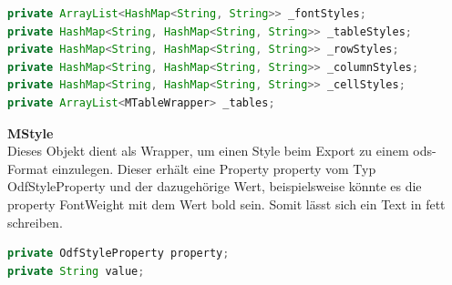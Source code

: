 \begin{lstlisting}[caption=Repräsentation einer kompletten Libre Office Calc Datei, language=Java]
private ArrayList<HashMap<String, String>> _fontStyles;
private HashMap<String, HashMap<String, String>> _tableStyles;
private HashMap<String, HashMap<String, String>> _rowStyles;
private HashMap<String, HashMap<String, String>> _columnStyles;
private HashMap<String, HashMap<String, String>> _cellStyles;
private ArrayList<MTableWrapper> _tables;
\end{lstlisting}
\textbf{MStyle}\\
Dieses Objekt dient als Wrapper, um einen Style beim Export zu einem ods-Format einzulegen. Dieser erhält eine Property property vom Typ OdfStyleProperty und der dazugehörige Wert, beispielsweise könnte es die property {\frqq}FontWeight{\flqq} mit dem Wert {\frqq}bold{\flqq} sein. Somit lässt sich ein Text in fett schreiben.

\begin{lstlisting}[caption=Repräsentation eines Styles einer Libre Office Calc Datei, language=Java]
private OdfStyleProperty property;
private String value;
\end{lstlisting}

